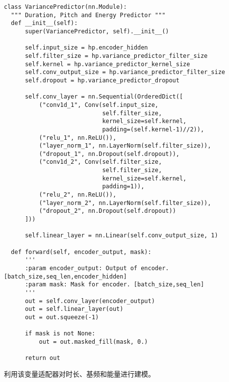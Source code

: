 \documentclass[cn,10pt,math=newtx,citestyle=gb7714-2015,bibstyle=gb7714-2015]{elegantbook}
\begin{document}
\begin{lstlisting}
class VariancePredictor(nn.Module):
  """ Duration, Pitch and Energy Predictor """
  def __init__(self):
      super(VariancePredictor, self).__init__()

      self.input_size = hp.encoder_hidden
      self.filter_size = hp.variance_predictor_filter_size
      self.kernel = hp.variance_predictor_kernel_size
      self.conv_output_size = hp.variance_predictor_filter_size
      self.dropout = hp.variance_predictor_dropout

      self.conv_layer = nn.Sequential(OrderedDict([
          ("conv1d_1", Conv(self.input_size,
                            self.filter_size,
                            kernel_size=self.kernel,
                            padding=(self.kernel-1)//2)),
          ("relu_1", nn.ReLU()),
          ("layer_norm_1", nn.LayerNorm(self.filter_size)),
          ("dropout_1", nn.Dropout(self.dropout)),
          ("conv1d_2", Conv(self.filter_size,
                            self.filter_size,
                            kernel_size=self.kernel,
                            padding=1)),
          ("relu_2", nn.ReLU()),
          ("layer_norm_2", nn.LayerNorm(self.filter_size)),
          ("dropout_2", nn.Dropout(self.dropout))
      ]))

      self.linear_layer = nn.Linear(self.conv_output_size, 1)

  def forward(self, encoder_output, mask):
      '''
      :param encoder_output: Output of encoder. [batch_size,seq_len,encoder_hidden]
      :param mask: Mask for encoder. [batch_size,seq_len]
      '''
      out = self.conv_layer(encoder_output)
      out = self.linear_layer(out)
      out = out.squeeze(-1)

      if mask is not None:
          out = out.masked_fill(mask, 0.)

      return out
\end{lstlisting}

利用该变量适配器对时长、基频和能量进行建模。
\end{document}

